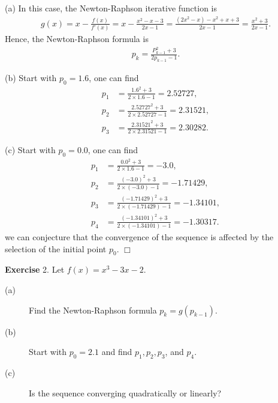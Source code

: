 \documentclass[UTF8,12pt,hyperref]{ctexart}
\makeatletter
\newenvironment{exercise}[1][{\color{blue}\bf Exercise}]%
{%
 \begin{center}   \begin{lrbox}{\@tempboxa}%
    \begin{minipage}{\textwidth}%
  {\color{blue}\bfseries
#1}   }{%
    \end{minipage}%
    \end{lrbox}
    \colorbox{green}{\noindent\usebox{\@tempboxa}} \end{center}  
}
\newenvironment{solve}[1][\color{blue}\bf Solve]{\begin{trivlist}
\item[\hskip \labelsep {\color{blue}\bfseries
#1}]}{\hfill$\Box$\end{trivlist}}
\makeatother
\begin{document}
\begin{solve}
 (a) In this case, the Newton-Raphson iterative function is
  \begin{align*}
    g(x)= x - \frac{f(x)}{f'(x)} = x - \frac{x^2-x-3}{2x-1} = \frac{(2x^2-x)-x^2+x+3}{2x-1}=\frac{x^2+3}{2x-1}.
  \end{align*}
  Hence, the Newton-Raphson formula is
  \begin{align}
    \label{eq:Newton-Raphson formula 1}
    p_k=\frac{P_{k-1}^2+3}{2p_{k-1}-1}.
  \end{align}
  \par
  (b) Start with $p_0=1.6$, one can find
  \begin{align*}
    p_1 &= \frac{1.6^2+3}{2\times 1.6-1}=2.52727,\\
    p_2 &= \frac{2.52727^2+3}{2\times 2.52727 -1}= 2.31521,\\
    p_3 &= \frac{2.31521^2+3}{2\times 2.31521 -1}= 2.30282.
  \end{align*}
  \par
  (c) Start with $p_0=0.0$, one can find
  \begin{align*}
    p_1 &= \frac{0.0^2+3}{2\times 1.6-1}=-3.0,\\
    p_2 &= \frac{(-3.0)^2+3}{2\times (-3.0) -1}= -1.71429,\\
    p_3 &= \frac{(-1.71429)^2+3}{2\times (-1.71429) -1}= -1.34101,\\
    p_4 &= \frac{(-1.34101)^2+3}{2\times (-1.34101) -1}= -1.30317.
  \end{align*}
  we can conjecture that the convergence of the sequence is affected by the selection of the initial point $p_0$.  
\end{solve}
 
 
\begin{exercise}2. \quad
 Let $f(x) = x^3-3x-2$. 
\begin{description}
\item[(a)] Find the Newton-Raphson formula $p_k = g (p_{k-1})$. 
\item[(b)] Start with $p_0 = 2.1$ and find $p_1, p_2, p_3$, and $p_4$. 
\item[(c)] Is the sequence converging quadratically or linearly?
\end{description}
\end{exercise}
 
\end{document}
